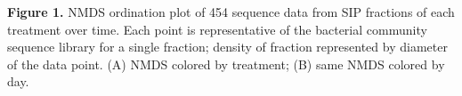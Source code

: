 \textbf{Figure 1.} NMDS ordination plot of 454 sequence data from SIP fractions of each treatment over time. Each point is representative of the bacterial community sequence library for a single fraction; density of fraction represented by diameter of the data point. (A) NMDS colored by treatment; (B) same NMDS colored by day.